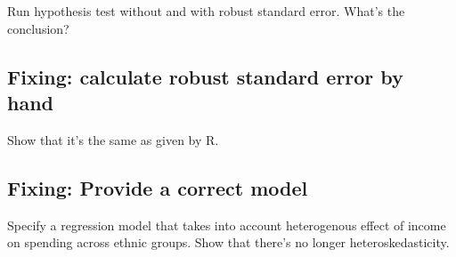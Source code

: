 \documentclass{article}\usepackage[]{graphicx}\usepackage[]{color}
\begin{document}
Run hypothesis test without and with robust standard error. What's the conclusion?

\subsection{Fixing: calculate robust standard error by hand}

Show that it's the same as given by R.

\subsection{Fixing: Provide a correct model}

Specify a regression model that takes into account heterogenous effect of income on spending across ethnic groups. Show that there's no longer heteroskedasticity.
\end{document}
